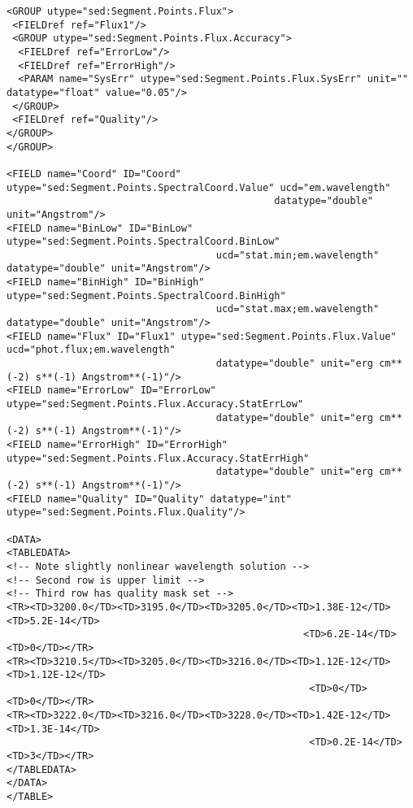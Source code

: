 \documentclass[11pt]{article}
\newenvironment{fmpage}
     {\begin{lrbox}{\fmbox}\begin{minipage}{6.5in}}
     {\end{minipage}\end{lrbox}\colorbox{iblue}{\fbox{\usebox{\fmbox}}}}
\begin{document}
{\begin{flushleft}
\begin{fmpage}
\begin{verbatim}
\end{verbatim}
\end{fmpage}


\begin{fmpage}
\begin{verbatim}
<GROUP utype="sed:Segment.Points.Flux">
 <FIELDref ref="Flux1"/>
 <GROUP utype="sed:Segment.Points.Flux.Accuracy">
  <FIELDref ref="ErrorLow"/>
  <FIELDref ref="ErrorHigh"/>
  <PARAM name="SysErr" utype="sed:Segment.Points.Flux.SysErr" unit="" datatype="float" value="0.05"/>
 </GROUP>
 <FIELDref ref="Quality"/>
</GROUP>
</GROUP>

<FIELD name="Coord" ID="Coord" utype="sed:Segment.Points.SpectralCoord.Value" ucd="em.wavelength" 
                                              datatype="double" unit="Angstrom"/>
<FIELD name="BinLow" ID="BinLow" utype="sed:Segment.Points.SpectralCoord.BinLow" 
                                    ucd="stat.min;em.wavelength" datatype="double" unit="Angstrom"/>
<FIELD name="BinHigh" ID="BinHigh" utype="sed:Segment.Points.SpectralCoord.BinHigh" 
                                    ucd="stat.max;em.wavelength" datatype="double" unit="Angstrom"/>
<FIELD name="Flux" ID="Flux1" utype="sed:Segment.Points.Flux.Value" ucd="phot.flux;em.wavelength" 
                                    datatype="double" unit="erg cm**(-2) s**(-1) Angstrom**(-1)"/>
<FIELD name="ErrorLow" ID="ErrorLow" utype="sed:Segment.Points.Flux.Accuracy.StatErrLow" 
                                    datatype="double" unit="erg cm**(-2) s**(-1) Angstrom**(-1)"/>
<FIELD name="ErrorHigh" ID="ErrorHigh" utype="sed:Segment.Points.Flux.Accuracy.StatErrHigh" 
                                    datatype="double" unit="erg cm**(-2) s**(-1) Angstrom**(-1)"/>
<FIELD name="Quality" ID="Quality" datatype="int" utype="sed:Segment.Points.Flux.Quality"/>

<DATA>
<TABLEDATA>
<!-- Note slightly nonlinear wavelength solution -->
<!-- Second row is upper limit -->
<!-- Third row has quality mask set -->
<TR><TD>3200.0</TD><TD>3195.0</TD><TD>3205.0</TD><TD>1.38E-12</TD><TD>5.2E-14</TD> 
                                                   <TD>6.2E-14</TD><TD>0</TD></TR>
<TR><TD>3210.5</TD><TD>3205.0</TD><TD>3216.0</TD><TD>1.12E-12</TD><TD>1.12E-12</TD>
                                                    <TD>0</TD><TD>0</TD></TR>
<TR><TD>3222.0</TD><TD>3216.0</TD><TD>3228.0</TD><TD>1.42E-12</TD><TD>1.3E-14</TD>
                                                    <TD>0.2E-14</TD><TD>3</TD></TR>
</TABLEDATA>
</DATA>
</TABLE>


\end{verbatim}
\end{fmpage}
\end{flushleft}}
\end{document}
